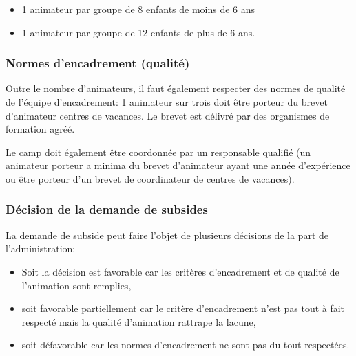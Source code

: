 \begin{itemize}
    \item 1 animateur par groupe de 8 enfants de moins de 6 ans
    \item 1 animateur par groupe de 12 enfants de plus de 6 ans.
    
    
\end{itemize}

\subsubsection{Normes d'encadrement (qualité)}
Outre le nombre d'animateurs, il faut également respecter des normes de qualité de l'équipe d'encadrement: 1 animateur sur trois doit être porteur du brevet d'animateur centres de vacances. Le brevet est délivré par des organismes de formation agréé. 

Le camp doit également être coordonnée par un responsable qualifié (un animateur porteur a minima du brevet d'animateur ayant une année d'expérience ou être porteur d'un brevet de coordinateur de centres de vacances).

\subsubsection{Décision de la demande de subsides}
La demande de subside peut faire l'objet de plusieurs décisions de la part de l'administration: 

\begin{itemize}
    \item Soit la décision est favorable car les critères d'encadrement et de qualité de l'animation sont remplies,
    \item soit favorable partiellement car le critère d'encadrement n'est pas tout à fait respecté mais la qualité d'animation rattrape la lacune,
    \item soit défavorable car les normes d'encadrement ne sont pas du tout respectées. 
\end{itemize}



